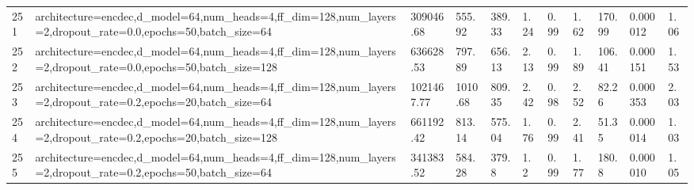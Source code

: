 \begin{longtable}{C{0.8cm} L{2cm} C{1.15cm} C{1.15cm} C{1.15cm} C{1.15cm} C{0.85cm} C{1.25cm} C{1.2cm} C{1.5cm} C{1.0cm}}
251 & architecture=encdec,\newline d\_model=64,\newline num\_heads=4,\newline ff\_dim=128,\newline num\_layers=2,\newline dropout\_rate=0.0,\newline epochs=50,\newline batch\_size=64 & 309046.68 & 555.92 & 389.33 & 1.24 & 0.99 & 1.62 & 170.99 & 0.000012 & 1.06 \\
252 & architecture=encdec,\newline d\_model=64,\newline num\_heads=4,\newline ff\_dim=128,\newline num\_layers=2,\newline dropout\_rate=0.0,\newline epochs=50,\newline batch\_size=128 & 636628.53 & 797.89 & 656.13 & 2.13 & 0.99 & 1.89 & 106.41 & 0.000151 & 1.53 \\
253 & architecture=encdec,\newline d\_model=64,\newline num\_heads=4,\newline ff\_dim=128,\newline num\_layers=2,\newline dropout\_rate=0.2,\newline epochs=20,\newline batch\_size=64 & 1021467.77 & 1010.68 & 809.35 & 2.42 & 0.98 & 2.52 & 82.26 & 0.000353 & 2.03 \\
254 & architecture=encdec,\newline d\_model=64,\newline num\_heads=4,\newline ff\_dim=128,\newline num\_layers=2,\newline dropout\_rate=0.2,\newline epochs=20,\newline batch\_size=128 & 661192.42 & 813.14 & 575.04 & 1.76 & 0.99 & 2.41 & 51.35 & 0.000014 & 1.03 \\
255 & architecture=encdec,\newline d\_model=64,\newline num\_heads=4,\newline ff\_dim=128,\newline num\_layers=2,\newline dropout\_rate=0.2,\newline epochs=50,\newline batch\_size=64 & 341383.52 & 584.28 & 379.8 & 1.2 & 0.99 & 1.77 & 180.8 & 0.000010 & 1.05 \\

\end{longtable}
